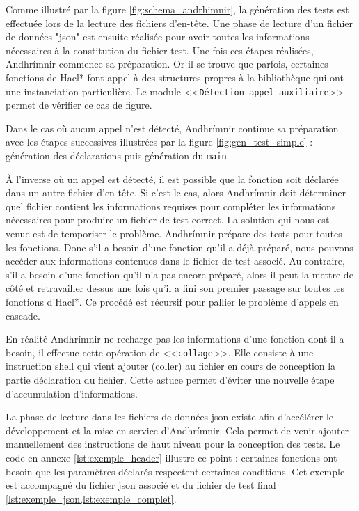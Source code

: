 Comme illustré par la figure \ref{fig:schema_andrhimnir}, la génération des tests est effectuée lors de la lecture des fichiers d'en-tête. Une phase de lecture d'un fichier de données "json" est ensuite réalisée pour avoir toutes les informations nécessaires à la constitution du fichier test. Une fois ces étapes réalisées, Andhrímnir commence sa préparation. Or il se trouve que parfois, certaines fonctions de Hacl* font appel à des structures propres à la bibliothèque qui ont une instanciation particulière. Le module <<\texttt{Détection appel auxiliaire}>> permet de vérifier ce cas de figure.\smallbreak

Dans le cas où aucun appel n'est détecté, Andhrímnir continue sa préparation avec les étapes successives illustrées par la figure \ref{fig:gen_test_simple} : génération des déclarations puis génération du \texttt{main}.\smallbreak

À l'inverse où un appel est détecté, il est possible que la fonction soit déclarée dans un autre fichier d'en-tête. Si c'est le cas, alors Andhrímnir doit déterminer quel fichier contient les informations requises pour compléter les informations nécessaires pour produire un fichier de test correct. La solution qui nous est venue est de temporiser le problème. Andhrímnir prépare des tests pour toutes les fonctions. Donc s'il a besoin d'une fonction qu'il a déjà préparé, nous pouvons accéder aux informations contenues dans le fichier de test associé. Au contraire, s'il a besoin d'une fonction qu'il n'a pas encore préparé, alors il peut la mettre de côté et retravailler dessus une fois qu'il a fini son premier passage sur toutes les fonctions d'Hacl*. Ce procédé est récursif pour pallier le problème d'appels en cascade.\smallbreak

En réalité Andhrímnir ne recharge pas les informations d'une fonction dont il a besoin, il effectue cette opération de <<\texttt{collage}>>. Elle consiste à une instruction shell qui vient ajouter (coller) au fichier en cours de conception la partie déclaration du fichier. Cette astuce permet d'éviter une nouvelle étape d'accumulation d'informations.\medbreak

La phase de lecture dans les fichiers de données json existe afin d'accélérer le développement et la mise en service d'Andhrímnir. Cela permet de venir ajouter manuellement des instructions de haut niveau pour la conception des tests. Le code en annexe \ref{lst:exemple_header} illustre ce point : certaines fonctions ont besoin que les paramètres déclarés respectent certaines conditions. Cet exemple est accompagné du fichier json associé et du fichier de test final \ref{lst:exemple_json,lst:exemple_complet}.  



